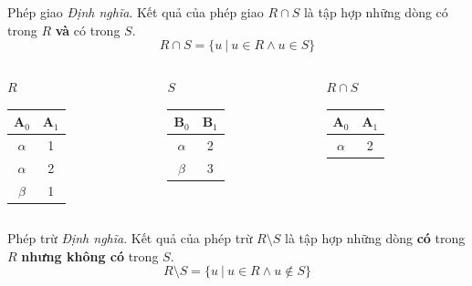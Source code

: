 \documentclass[11pt]{beamer}
\begin{document}
  \begin{frame}{Phép giao}
    \textit{Định nghĩa}. Kết quả của phép giao $R \cap  S$ là tập hợp những dòng có trong $R$ \textbf{và} có trong $S$.
    $$R \cap S = \{u\ |\ u \in R \wedge u \in S\}$$
  \end{frame}
  \begin{frame}
    \begin{columns}[T]
      \begin{column}{0.3\textwidth}
        \centering $R$
        \medskip \\
        \begin{tabular}{|c|c|}
          \hline
          $\textbf{A}_0$ & $\textbf{A}_1$ \\[0.5ex] \hline\hline
          $\alpha$ & 1 \\ \hline
          $\alpha$ & 2 \\ \hline
          $\beta$ & 1 \\ \hline
        \end{tabular}
      \end{column}
      \begin{column}{0.3\textwidth}
        \centering $S$
        \medskip \\
        \begin{tabular}{|c|c|}
          \hline
          $\textbf{B}_0$ & $\textbf{B}_1$ \\[0.5ex] \hline\hline
          $\alpha$ & 2 \\ \hline
          $\beta$ & 3 \\ \hline
        \end{tabular}
      \end{column}
      \begin{column}{0.3\textwidth}
        \centering $R \cap S$
        \medskip \\
        \begin{tabular}{|c|c|}
          \hline
          $\textbf{A}_0$ & $\textbf{A}_1$ \\[0.5ex] \hline\hline
          $\alpha$ & 2 \\ \hline
        \end{tabular}
      \end{column}
    \end{columns}
  \end{frame}
  \begin{frame}{Phép trừ}
    \textit{Định nghĩa}. Kết quả của phép trừ $R \setminus S$ là tập hợp những dòng \textbf{có} trong $R$ 
    \textbf{nhưng không có} trong $S$.
    $$R \setminus S = \{u\ |\ u \in R \wedge u \not\in S\}$$
  \end{frame}
\end{document}
